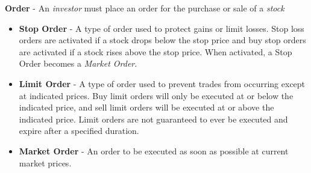 {\textbf{Order} - An \emph{investor} must place an order for the purchase or sale of a \emph{stock}
\begin{itemize}
\item \textbf{Stop Order} - A type of order used to protect gains or limit losses. Stop loss
orders are activated if a stock drops below the stop price and buy stop orders
are activated if a stock rises above the stop price. When activated, a Stop Order becomes a
\emph{Market Order}. 
\item \textbf{Limit Order} - A type of order used to prevent trades from occurring except at indicated
prices. Buy limit orders will only be executed at or below the indicated price, and sell limit
orders will be executed at or above the indicated price. Limit orders are not guaranteed to ever
be executed and expire after a specified duration.
\item \textbf{Market Order} - An order to be executed as soon as possible at current market prices.
\end{itemize}
}